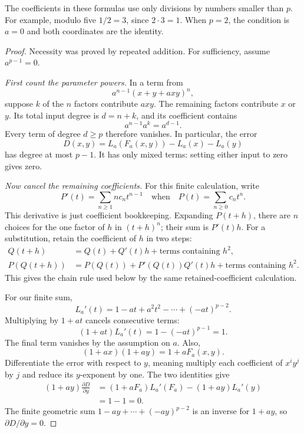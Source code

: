 \documentclass[11pt,letterpaper]{article}
\numberwithin{equation}{section}
\theoremstyle{definition}\newtheorem{example}[theorem]{Example}
\begin{document}
The coefficients in these formulas use only divisions by numbers smaller than \(p\). For example, modulo five \(1/2=3\), since \(2\cdot3=1\). When \(p=2\), the condition is \(a=0\) and both coordinates are the identity.

\begin{proof}
Necessity was proved by repeated addition. For sufficiency, assume \(a^{p-1}=0\).

\emph{First count the parameter powers.} In a term from
\[
 a^{n-1}(x+y+a xy)^n,
\]
suppose \(k\) of the \(n\) factors contribute \(a xy\). The remaining factors contribute \(x\) or \(y\). Its total input degree is \(d=n+k\), and its coefficient contains
\[
 a^{n-1}a^k=a^{d-1}.
\]
Every term of degree \(d\ge p\) therefore vanishes. In particular, the error
\[
 D(x,y)=L_a(F_a(x,y))-L_a(x)-L_a(y)
\]
has degree at most \(p-1\). It has only mixed terms: setting either input to zero gives zero.

\emph{Now cancel the remaining coefficients.} For this finite calculation, write
\[
 P'(t)=\sum_{n\ge1}n c_nt^{n-1}
 \quad\text{when}\quad P(t)=\sum_{n\ge0}c_nt^n.
\]
This derivative is just coefficient bookkeeping. Expanding \(P(t+h)\), there are \(n\) choices for the one factor of \(h\) in \((t+h)^n\); their sum is \(P'(t)h\). For a substitution, retain the coefficient of \(h\) in two steps:
\begin{align*}
 Q(t+h)&=Q(t)+Q'(t)h+\text{terms containing }h^2,\\
 P(Q(t+h))&=P(Q(t))+P'(Q(t))Q'(t)h
 +\text{terms containing }h^2.
\end{align*}
This gives the chain rule used below by the same retained-coefficient calculation.

For our finite sum,
\[
 L_a'(t)=1-at+a^2t^2-\cdots+(-at)^{p-2}.
\]
Multiplying by \(1+at\) cancels consecutive terms:
\begin{equation}\label{eq:finite-geometric}
 (1+at)L_a'(t)=1-(-at)^{p-1}=1.
\end{equation}
The final term vanishes by the assumption on \(a\). Also,
\[
 (1+ax)(1+ay)=1+aF_a(x,y).
\]
Differentiate the error with respect to \(y\), meaning multiply each coefficient of \(x^iy^j\) by \(j\) and reduce its \(y\)-exponent by one. The two identities give
\begin{align*}
 (1+ay)\frac{\partial D}{\partial y}
 &=(1+aF_a)L_a'(F_a)-(1+ay)L_a'(y)\\
 &=1-1=0.
\end{align*}
The finite geometric sum \(1-ay+\cdots+(-ay)^{p-2}\) is an inverse for \(1+ay\), so \(\partial D/\partial y=0\).


\end{proof}
\end{document}
